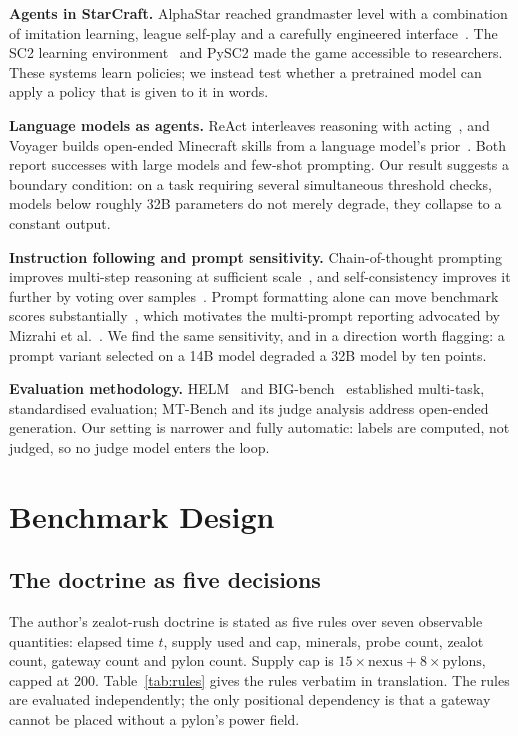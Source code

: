 \documentclass[journal]{IEEEtran}
\begin{document}
\textbf{Agents in StarCraft.} AlphaStar reached grandmaster level with a combination of
imitation learning, league self-play and a carefully engineered interface~\cite{vinyals2019}.
The SC2 learning environment~\cite{vinyals2017} and PySC2 made the game accessible to
researchers. These systems learn policies; we instead test whether a pretrained model can apply
a policy that is given to it in words.

\textbf{Language models as agents.} ReAct interleaves reasoning with acting~\cite{yao2023}, and
Voyager builds open-ended Minecraft skills from a language model's prior~\cite{wang2023voyager}.
Both report successes with large models and few-shot prompting. Our result suggests a boundary
condition: on a task requiring several simultaneous threshold checks, models below roughly 32B
parameters do not merely degrade, they collapse to a constant output.

\textbf{Instruction following and prompt sensitivity.} Chain-of-thought prompting improves
multi-step reasoning at sufficient scale~\cite{wei2022}, and self-consistency improves it
further by voting over samples~\cite{wang2023sc}. Prompt formatting alone can move benchmark
scores substantially~\cite{sclar2024}, which motivates the multi-prompt reporting advocated by
Mizrahi et al.~\cite{mizrahi2024}. We find the same sensitivity, and in a direction worth
flagging: a prompt variant selected on a 14B model degraded a 32B model by ten points.

\textbf{Evaluation methodology.} HELM~\cite{liang2023} and BIG-bench~\cite{srivastava2023}
established multi-task, standardised evaluation; MT-Bench and its judge analysis
\cite{zheng2023} address open-ended generation. Our setting is narrower and fully automatic:
labels are computed, not judged, so no judge model enters the loop.

\section{Benchmark Design}

\subsection{The doctrine as five decisions}

The author's zealot-rush doctrine is stated as five rules over seven observable quantities:
elapsed time $t$, supply used and cap, minerals, probe count, zealot count, gateway count and
pylon count. Supply cap is $15 \times \text{nexus} + 8 \times \text{pylons}$, capped at 200.
Table~\ref{tab:rules} gives the rules verbatim in translation. The rules are evaluated
independently; the only positional dependency is that a gateway cannot be placed without a
pylon's power field.
\end{document}
